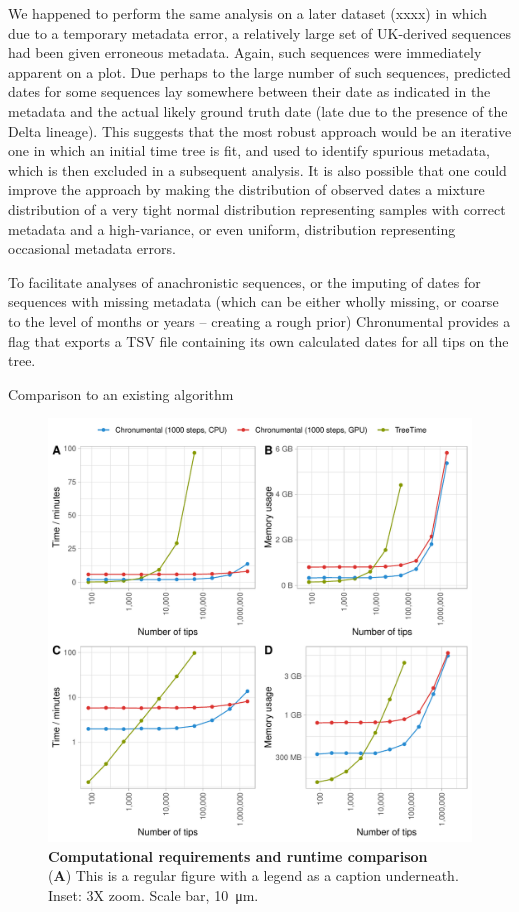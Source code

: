 We happened to perform the same analysis on a later dataset (xxxx) in which due to a temporary metadata error, a relatively large set of UK-derived sequences had been given erroneous metadata. Again, such sequences were immediately apparent on a plot. Due perhaps to the large number of such sequences, predicted dates for some sequences lay somewhere between their date as indicated in the metadata and the actual likely ground truth date (late due to the presence of the Delta lineage). This suggests that the most robust approach would be an iterative one in which an initial time tree is fit, and used to identify  spurious metadata, which is then excluded in a subsequent analysis. It is also possible that one could improve the approach by making the distribution of observed dates a mixture distribution of a very tight normal distribution representing samples with correct metadata and a high-variance, or even uniform, distribution representing occasional metadata errors.

To facilitate analyses of anachronistic sequences, or the imputing of dates for sequences with missing metadata (which can be either wholly missing, or coarse to the level of months or years -- creating a rough prior) Chronumental provides a flag that exports a TSV file containing its own calculated dates for all tips on the tree.

Comparison to an existing algorithm

\begin{figure}
\centering
\includegraphics[width=0.9\linewidth]{manuscript/Figures/performance.pdf}
\caption{\textbf{Computational requirements and runtime comparison}\\

(\textbf{A}) This is a regular figure with a legend as a caption underneath. Inset: 3X zoom. Scale bar, \SI{10}{\micro\meter}.}
\label{fig:performance}
\end{figure}

